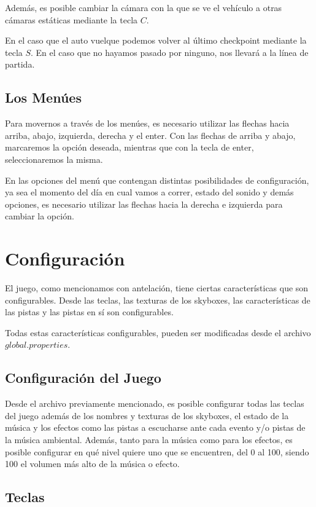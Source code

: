 \documentclass[a4paper,10pt]{article}
\begin{document}
Adem\'as, es posible cambiar la c\'amara con la que se ve el veh\'iculo a otras
c\'amaras est\'aticas mediante la tecla $C$.

En el caso que el auto vuelque podemos volver al \'ultimo checkpoint mediante
la tecla $S$. En el caso que no hayamos pasado por ninguno, nos llevar\'a a la
l\'inea de partida.

\subsection{Los Men\'ues}
Para movernos a trav\'es de los men\'ues, es necesario utilizar las flechas
hacia
arriba, abajo, izquierda, derecha y el enter.  Con las flechas de arriba y
abajo, marcaremos la opci\'on deseada, mientras que con la tecla de enter,
seleccionaremos la misma.

En las opciones del men\'u que contengan distintas posibilidades de
configuraci\'on, ya sea el momento del d\'ia en cual vamos a correr, estado del
sonido y dem\'as opciones, es necesario utilizar las flechas hacia la derecha e
izquierda para cambiar la opci\'on.
\section{Configuraci\'on}
\label{configuracion}
El juego, como mencionamos con antelaci\'on, tiene ciertas caracter\'isticas
que
son configurables.  Desde las teclas, las texturas de los skyboxes, las
caracter\'isticas de las pistas y las pistas en s\'i son configurables.

Todas estas caracter\'isticas configurables, pueden ser modificadas desde el
archivo $global.properties$.

\subsection{Configuraci\'on del Juego}

Desde el archivo previamente mencionado, es posible configurar todas las teclas
del juego adem\'as de los nombres y texturas de los skyboxes, el estado de la
m\'usica y los efectos como las pistas a escucharse ante cada evento y/o pistas
de la m\'usica ambiental.  Adem\'as, tanto para la m\'usica como para los
efectos,
es
posible configurar en qu\'e nivel quiere uno que se encuentren, del 0 al 100,
siendo 100 el volumen m\'as alto de la m\'usica o efecto.

\subsection{Teclas}
\end{document}
